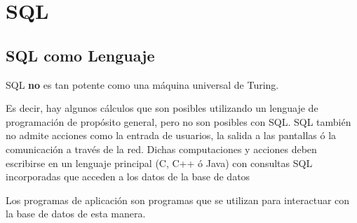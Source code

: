 \documentclass[12pt, fleqn]{report}                             %
\begin{document}
    \chapter{SQL}

        \clearpage
        \section{SQL como Lenguaje}
            
            SQL \textbf{no} es tan potente como una máquina universal de Turing.

            Es decir, hay algunos cálculos que son posibles utilizando un lenguaje de programación
            de propósito general, pero no son posibles con SQL.
            SQL también no admite acciones como la entrada de usuarios, la salida a las pantallas 
            ó la comunicación a través de la red.
            Dichas computaciones y acciones deben escribirse en un lenguaje principal (C, C++ ó Java)
            con consultas SQL incorporadas que acceden a los datos de la base de datos

            Los programas de aplicación son programas que se utilizan para interactuar con la base de datos de esta manera.
\end{document}
